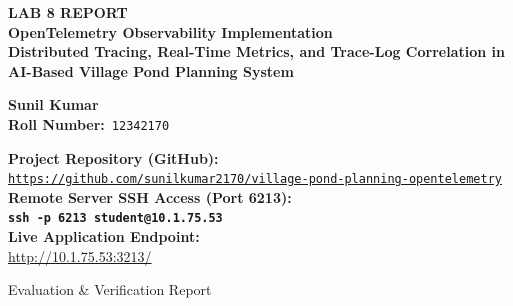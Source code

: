 \documentclass[11pt,a4paper]{article}
\begin{document}
\begin{titlepage}
    \centering
    \vspace*{1.2cm}
    
    \begin{tcolorbox}[enhanced, colback=lightbg, colframe=primary, boxrule=1.5pt, arc=6pt, width=0.96\textwidth]
        \centering\vspace{0.4cm}
        {\LARGE\textbf{\color{primary}LAB 8 REPORT}}\\[0.35cm]
        {\huge\textbf{\color{accent}OpenTelemetry Observability Implementation}}\\[0.45cm]
        {\Large\textbf{Distributed Tracing, Real-Time Metrics, and Trace-Log Correlation in AI-Based Village Pond Planning System}}\\[0.4cm]
    \end{tcolorbox}
    
    \vspace{2.0cm}
    
    \begin{minipage}[t]{0.85\textwidth}
        \centering
        {\LARGE\textbf{Sunil Kumar}}\\[0.3cm]
        {\Large\textbf{Roll Number:}\ \texttt{12342170}}\\[0.2cm]
    \end{minipage}

    \vspace{2.2cm}
    
    \begin{tcolorbox}[enhanced, colback=codebg, colframe=accent, boxrule=1.2pt, arc=5pt, width=0.92\textwidth]
        \centering\vspace{0.2cm}
        \textbf{\color{primary}Project Repository (GitHub):}\\[0.1cm]
        \href{https://github.com/sunilkumar2170/village-pond-planning-opentelemetry}{\texttt{https://github.com/sunilkumar2170/village-pond-planning-opentelemetry}}\\[0.4cm]
        
        \textbf{\color{primary}Remote Server SSH Access (Port 6213):}\\[0.15cm]
        \colorbox{lightbg}{\large\textbf{\texttt{ssh -p 6213 student@10.1.75.53}}}\\[0.4cm]
        
        \textbf{\color{primary}Live Application Endpoint:}\\[0.1cm]
        \url{http://10.1.75.53:3213/}\\[0.2cm]
    \end{tcolorbox}
    
    \vfill
    {\small\color{gray}Evaluation \& Verification Report}
\end{titlepage}
\end{document}
